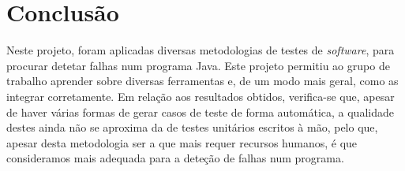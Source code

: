 \documentclass[12pt, a4paper]{article}
\begin{document}
\section{Conclusão}

Neste projeto, foram aplicadas diversas metodologias de testes de \emph{software}, para procurar
detetar falhas num programa Java. Este projeto permitiu ao grupo de trabalho aprender sobre
diversas ferramentas e, de um modo mais geral, como as integrar corretamente. Em relação aos
resultados obtidos, verifica-se que, apesar de haver várias formas de gerar casos de teste de forma
automática, a qualidade destes ainda não se aproxima da de testes unitários escritos à mão, pelo
que, apesar desta metodologia ser a que mais requer recursos humanos, é que consideramos mais
adequada para a deteção de falhas num programa.
\end{document}
